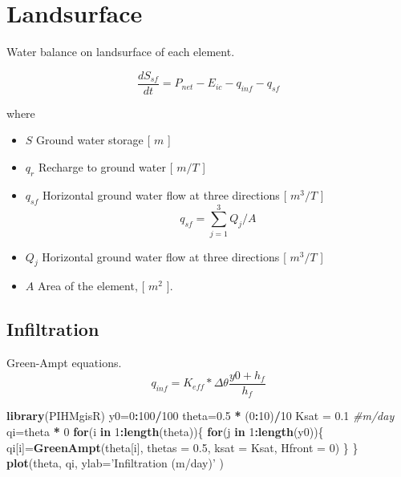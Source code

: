 \documentclass[]{scrbook}
\newenvironment{Shaded}{\begin{snugshade}}{\end{snugshade}}
\newcommand{\KeywordTok}[1]{\textcolor[rgb]{0.13,0.29,0.53}{\textbf{#1}}}
\newcommand{\DataTypeTok}[1]{\textcolor[rgb]{0.13,0.29,0.53}{#1}}
\newcommand{\DecValTok}[1]{\textcolor[rgb]{0.00,0.00,0.81}{#1}}
\newcommand{\FloatTok}[1]{\textcolor[rgb]{0.00,0.00,0.81}{#1}}
\newcommand{\StringTok}[1]{\textcolor[rgb]{0.31,0.60,0.02}{#1}}
\newcommand{\CommentTok}[1]{\textcolor[rgb]{0.56,0.35,0.01}{\textit{#1}}}
\newcommand{\ControlFlowTok}[1]{\textcolor[rgb]{0.13,0.29,0.53}{\textbf{#1}}}
\newcommand{\OperatorTok}[1]{\textcolor[rgb]{0.81,0.36,0.00}{\textbf{#1}}}
\newcommand{\NormalTok}[1]{#1}
\providecommand{\tightlist}{%
  \setlength{\itemsep}{0pt}\setlength{\parskip}{0pt}}
\begin{document}
\chapter{Landsurface}\label{surf}

Water balance on landsurface of each element.

\[ \frac {dS_{sf}}{dt} = P_{net} - E_{ic} -  q_{inf} - q_{sf} \]

where

\begin{itemize}
\tightlist
\item
  \(S\) Ground water storage {[} \(m\) {]}
\item
  \(q_r\) Recharge to ground water {[} \(m/T\) {]}
\item
  \(q_{sf}\) Horizontal ground water flow at three directions {[}
  \(m^3/T\) {]} \[q_{sf} = \sum_{j=1}^3 {Q_{j} } / {A}\]
\item
  \(Q_{j}\) Horizontal ground water flow at three directions {[}
  \(m^3/T\) {]}
\item
  \(A\) Area of the element, {[} \(m^2\) {]}.
\end{itemize}

\section{Infiltration}\label{infiltration}

Green-Ampt equations.
\[q_{inf} = K_{eff} * \Delta \theta \frac{y0 + h_{f}}{h_f}\]

\begin{Shaded}
\begin{Highlighting}[]
\KeywordTok{library}\NormalTok{(PIHMgisR)}
\NormalTok{y0=}\DecValTok{0}\OperatorTok{:}\DecValTok{100}\OperatorTok{/}\DecValTok{100}
\NormalTok{theta=}\FloatTok{0.5} \OperatorTok{*}\StringTok{ }\NormalTok{(}\DecValTok{0}\OperatorTok{:}\DecValTok{10}\NormalTok{)}\OperatorTok{/}\DecValTok{10}
\NormalTok{Ksat =}\StringTok{ }\FloatTok{0.1} \CommentTok{#m/day}
\NormalTok{qi=theta }\OperatorTok{*}\StringTok{ }\DecValTok{0}
\ControlFlowTok{for}\NormalTok{(i }\ControlFlowTok{in} \DecValTok{1}\OperatorTok{:}\KeywordTok{length}\NormalTok{(theta))\{}
  \ControlFlowTok{for}\NormalTok{(j }\ControlFlowTok{in} \DecValTok{1}\OperatorTok{:}\KeywordTok{length}\NormalTok{(y0))\{}
\NormalTok{    qi[i]=}\KeywordTok{GreenAmpt}\NormalTok{(theta[i], }\DataTypeTok{thetas =} \FloatTok{0.5}\NormalTok{, }\DataTypeTok{ksat =}\NormalTok{ Ksat, }\DataTypeTok{Hfront =} \DecValTok{0}\NormalTok{)}
\NormalTok{  \}}
\NormalTok{\}}
\KeywordTok{plot}\NormalTok{(theta, qi, }\DataTypeTok{ylab=}\StringTok{'Infiltration (m/day)'}\NormalTok{ )}
\end{Highlighting}
\end{Shaded}
\end{document}
